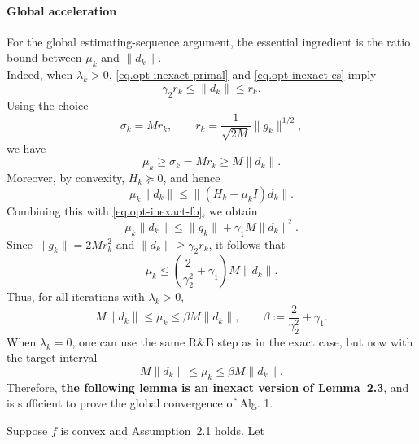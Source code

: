 \begin{itemize}
{              \paragraph{Global acceleration} For the global estimating-sequence
              argument, the essential ingredient is the
              ratio bound between \(\mu_k\) and \(\|d_k\|\).\\
              Indeed, when \(\lambda_k>0\), \eqref{eq.opt-inexact-primal} and
              \eqref{eq.opt-inexact-cs} imply
              \[
                  \gamma_2 r_k\le \|d_k\|\le r_k.
              \]
              Using the choice
              \[
                  \sigma_k=Mr_k,
                  \qquad
                  r_k=\frac{1}{\sqrt{2M}}\|g_k\|^{1/2},
              \]
              we have
              \[
                  \mu_k\ge \sigma_k=Mr_k\ge M\|d_k\|.
              \]
              Moreover, by convexity, \(H_k\succeq0\), and hence
              \[
                  \mu_k\|d_k\|
                  \le
                  \|(H_k+\mu_k I)d_k\|.
              \]
              Combining this with \eqref{eq.opt-inexact-fo}, we obtain
              \[
                  \mu_k\|d_k\|
                  \le
                  \|g_k\|+\gamma_1 M\|d_k\|^2.
              \]
              Since \(\|g_k\|=2Mr_k^2\) and \(\|d_k\|\ge \gamma_2 r_k\), it follows that
              \[
                  \mu_k
                  \le
                  \left(\frac{2}{\gamma_2^2}+\gamma_1\right)M\|d_k\|.
              \]
              Thus, for all iterations with \(\lambda_k>0\),
              \begin{equation}
                  \label{eq.inexact-ratio}
                  M\|d_k\|
                  \le
                  \mu_k
                  \le
                  \beta M\|d_k\|,
                  \qquad
                  \beta:=\frac{2}{\gamma_2^2}+\gamma_1.
              \end{equation}
              When \(\lambda_k=0\), one can use the same R\&B step as
              in the exact case, but now with the target interval
              \[
                  M\|d_k\|\le \mu_k\le \beta M\|d_k\|.
              \]
              Therefore, {\bf the following lemma is an inexact version of Lemma~2.3}, and
              is sufficient to prove the global convergence of Alg. 1. \\
              \begin{lemma}
                  \label{lem.inexact-inner-product-g-d}
                  Suppose \(f\) is convex and Assumption~2.1 holds. Let

\end{lemma}}
\end{itemize}
